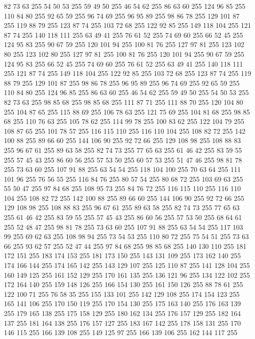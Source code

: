 82 73 63 255 54 50 53 255 59 49 50 255 46 54 62 255 86 63 60 255 124 96 85 255 110 84 80 255 92 65 59 255 96 74 69 255 96 95 89 255 98 86 78 255 129 101 87 255 119 88 79 255 123 87 74 255 103 72 68 255 122 92 85 255 149 118 104 255 121 87 74 255 140 118 111 255 63 49 41 255 76 61 52 255 74 69 60 255 66 52 45 255 124 95 83 255 90 67 59 255 120 101 94 255 100 81 76 255 127 97 81 255 123 102 80 255 123 102 80 255 127 97 81 255 100 81 76 255 120 101 94 255 90 67 59 255 124 95 83 255 66 52 45 255 74 69 60 255 76 61 52 255 63 49 41 255 140 118 111 255 121 87 74 255 149 118 104 255 122 92 85 255 103 72 68 255 123 87 74 255 119 88 79 255 129 101 87 255 98 86 78 255 96 95 89 255 96 74 69 255 92 65 59 255 110 84 80 255 124 96 85 255 86 63 60 255 46 54 62 255 59 49 50 255 54 50 53 255 82 73 63 255 98 85 68 255 98 85 68 255 111 87 71 255 111 88 70 255 120 104 80 255 104 87 65 255
115 88 69 255 106 78 63 255 121 75 69 255 104 81 68 255 98 85 68 255 110 76 63 255 105 78 62 255 114 99 78 255 100 83 62 255 122 104 79 255 108 87 65 255 101 78 57 255 116 115 110 255 116 110 104 255 108 82 72 255 142 100 88 255 89 66 60 255 144 106 90 255 92 72 66 255 129 108 98 255 108 88 83 255 96 67 61 255 89 63 58 255 82 74 73 255 77 65 63 255 61 46 42 255 83 59 55 255 57 45 43 255 86 60 56 255 57 53 50 255 60 57 53 255 51 47 46 255 98 81 78 255 73 63 60 255 107 91 88 255 63 54 54 255 118 104 100 255 70 63 64 255 111 101 96 255 76 56 55 255 116 84 76 255 80 57 54 255 80 68 72 255 103 69 63 255 55 50 47 255 97 84 68 255 108 95 73 255 84 76 72 255 116 115 110 255 116 110 104 255 108 82 72 255 142 100 88 255 89 66 60 255 144 106 90 255 92 72 66 255 129 108 98 255 108 88 83 255 96 67 61 255 89 63 58 255 82 74 73 255 77 65 63 255 61 46 42 255 83 59 55 255 57 45 43 255
86 60 56 255 57 53 50 255 68 64 61 255 52 48 47 255 98 81 78 255 73 63 60 255 107 91 88 255 63 54 54 255 117 103 99 255 69 62 63 255 108 98 94 255 73 54 53 255 110 80 72 255 75 54 51 255 73 63 66 255 93 62 57 255 52 47 44 255 97 84 68 255 98 85 68 255 140 130 110 255 181 172 151 255 183 174 153 255 181 173 150 255 143 131 109 255 173 162 140 255 174 166 144 255 174 165 142 255 143 129 107 255 125 110 87 255 141 128 104 255 160 149 125 255 161 152 129 255 170 161 135 255 136 121 96 255 134 122 102 255 172 164 140 255 159 148 126 255 166 154 130 255 161 150 126 255 88 78 61 255 122 100 71 255 76 58 35 255 155 133 101 255 142 129 108 255 174 154 123 255 165 141 106 255 170 150 119 255 170 154 130 255 175 163 140 255 176 163 139 255 179 165 138 255 175 158 129 255 180 162 134 255 176 157 129 255 182 164 137 255 181 164 138 255 176 157 127 255 183 167 142 255 178 158 131 255 170 146 115 255 166 139 108 255 149 125 97 255 166 139 106 255 162 144 117 255
